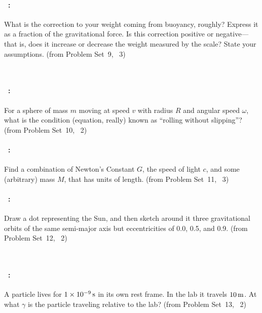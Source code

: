 \documentclass[12pt]{article} 
\begin{document}
\vfill

\paragraph{\problemname~\theproblem:}%
What is the correction to your weight coming from buoyancy, roughly?
Express it as a fraction of the gravitational force. Is this
correction positive or negative---that is, does it increase or
decrease the weight measured by the scale? State your assumptions.
%
(from Problem Set~9, \problemname~3)

\vfill
~
\clearpage

\paragraph{\problemname~\theproblem:}%
For a sphere of mass $m$ moving at speed $v$ with radius $R$ and
angular speed $\omega$, what is the condition (equation, really) known
as ``rolling without slipping''?
%
(from Problem Set~10, \problemname~2)

\vfill

\paragraph{\problemname~\theproblem:}%
Find a combination of Newton’s Constant $G$, the speed of light $c$,
and some (arbitrary) mass $M$, that has units of length.
%
(from Problem Set~11, \problemname~3)

\vfill

\paragraph{\problemname~\theproblem:}%
Draw a dot representing the Sun, and then sketch around it three
gravitational orbits of the same semi-major axis but eccentricities of
0.0, 0.5, and 0.9.
%
(from Problem Set~12, \problemname~2)

\vfill
~
\clearpage

\paragraph{\problemname~\theproblem:}%
A particle lives for $1\times 10^{-9}\,\mathrm{s}$ in its own rest frame. In
the lab it travels $10\,\mathrm{m}$. At what $\gamma$ is the particle
traveling relative to the lab?
%
(from Problem Set~13, \problemname~2)
\end{document}
